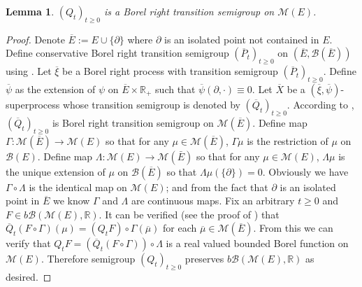 \documentclass[12pt,a4paper]{amsart}
\numberwithin{equation}{section}
\theoremstyle{plain}
\newtheorem{lem}[thm]{Lemma}
\theoremstyle{definition}
\theoremstyle{remark}
\begin{document}
\begin{lem} \label{thm:B}
	$(Q_t)_{t\geq 0}$ is a Borel right transition semigroup on $\mathcal M(E)$.
\end{lem}
\begin{proof}
	Denote $\overline E:= E\cup \{\partial\}$ where $\partial$ is an isolated point not contained in $E$. 
	Define conservative Borel right transition semigroup $(\overline P_t)_{t\geq 0}$ on $(\overline E,\mathscr B(\overline E))$ using \cite[(A.20)]{Li2011Measure-valued}.
	Let $\overline \xi$ be a Borel right process with transition semigroup $(\overline P_t)_{t\geq 0}$. 
	Define $\overline \psi$ as the extension of $\psi$ on $\overline E \times \mathbb R_+$ such that $\overline \psi(\partial,\cdot) \equiv 0$.
	Let $\overline X$ be a $(\overline \xi, \overline \psi)$-superprocess whose transition semigroup is denoted by $(\overline Q_t)_{t\geq 0}$. 
	According to \cite[Theorem 5.11]{Li2011Measure-valued}, $(\overline Q_t)_{t\geq 0}$ is Borel right transition semigroup on $\mathcal M(\overline E)$.
	Define map $\Gamma: \mathcal M(\overline E) \to \mathcal M(E)$ so that for any $\mu\in \mathcal M(\overline E)$, $\Gamma \mu$ is the restriction of $\mu$ on $\mathscr B(E)$. 
	Define map $\Lambda: \mathcal M(E) \to \mathcal M(\bar E)$ so that for any $\mu \in \mathcal M(E)$, $\Lambda \mu$ is the unique extension of $\mu$ on $\mathscr B(\overline E)$ so that $\Lambda \mu (\{\partial\}) = 0$.
	Obviously we have $\Gamma \circ \Lambda$ is the identical map on $\mathcal M(E)$; and from the fact that $\partial$ is an isolated point in $\overline E$ we know $\Gamma$ and $\Lambda$ are continuous maps.
	Fix an arbitrary $t\geq 0$ and $F\in b\mathcal B(\mathcal M(E),\mathbb R)$. 
	It can be verified (see the proof of \cite[Theorem 5.12]{Li2011Measure-valued}) that $\overline Q_t(F\circ \Gamma) (\mu) = (Q_t F) \circ \Gamma(\overline \mu)$ for each $\overline \mu \in \mathcal M(\overline E)$.
	From this we can verify that $Q_t F= (\overline Q_t(F\circ \Gamma) ) \circ \Lambda$ is a real valued bounded Borel function on $\mathcal M(E)$. 
	Therefore semigroup $(Q_t)_{t\geq 0}$ preserves $b\mathcal B(\mathcal M(E),\mathbb R)$ as desired. 
\end{proof}
\end{document}
